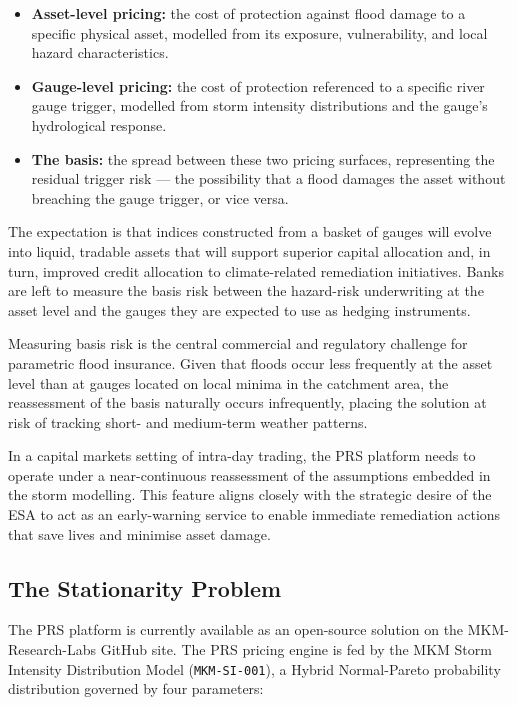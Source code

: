 \documentclass[11pt,a4paper]{article}
\begin{document}
\begin{itemize}
  \item \textbf{Asset-level pricing:} the cost of protection against flood damage
  to a specific physical asset, modelled from its exposure, vulnerability, and
  local hazard characteristics.
  \item \textbf{Gauge-level pricing:} the cost of protection referenced to a
  specific river gauge trigger, modelled from storm intensity distributions and
  the gauge's hydrological response.
  \item \textbf{The basis:} the spread between these two pricing surfaces,
  representing the residual trigger risk --- the possibility that a flood damages
  the asset without breaching the gauge trigger, or vice versa.
\end{itemize}

The expectation is that indices constructed from a basket of gauges will evolve
into liquid, tradable assets that will support superior capital allocation and, in
turn, improved credit allocation to climate-related remediation initiatives. Banks
are left to measure the basis risk between the hazard-risk underwriting at the
asset level and the gauges they are expected to use as hedging instruments.

Measuring basis risk is the central commercial and regulatory challenge for
parametric flood insurance. Given that floods occur less frequently at the asset
level than at gauges located on local minima in the catchment area, the
reassessment of the basis naturally occurs infrequently, placing the solution at
risk of tracking short- and medium-term weather patterns.

In a capital markets setting of intra-day trading, the PRS platform needs to
operate under a near-continuous reassessment of the assumptions embedded in the
storm modelling. This feature aligns closely with the strategic desire of the ESA
to act as an early-warning service to enable immediate remediation actions that
save lives and minimise asset damage.

\subsection{The Stationarity Problem}

The PRS platform is currently available as an open-source solution on the
MKM-Research-Labs GitHub site. The PRS pricing engine is fed by the MKM Storm
Intensity Distribution Model (\texttt{MKM-SI-001}), a Hybrid Normal-Pareto
probability distribution governed by four parameters:
\end{document}
